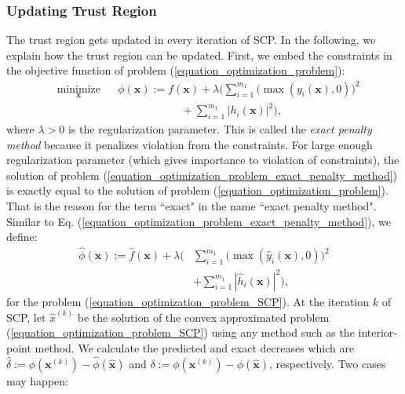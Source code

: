 \documentclass[lang=cn,10pt]{gorgeousnbook}
\numberwithin{equation}{section}%
\numberwithin{figure}{section}%
\begin{document}
\subsubsection{Updating Trust Region}


The trust region gets updated in every iteration of SCP. 
In the following, we explain how the trust region can be updated. 
First, we embed the constraints in the objective function of problem (\ref{equation_optimization_problem}):
\begin{equation}\label{equation_optimization_problem_exact_penalty_method}
\begin{aligned}
& \underset{\boldsymbol{x}}{\text{minimize}}
& & \phi(\boldsymbol{x}) := f(\boldsymbol{x}) + \lambda \Big(\sum_{i=1}^{m_1} \big(\max(y_i(\boldsymbol{x}), 0)\big)^2 \\
& & &~~~~~~~~~~~~~~~~~~~~~~~~~~ + \sum_{i=1}^{m_1} |h_i(\boldsymbol{x})|^2 \Big),
\end{aligned}
\end{equation}
where $\lambda > 0$ is the regularization parameter. 
This is called the \textit{exact penalty method} \cite{di1994exact} because it penalizes violation from the constraints. 
For large enough regularization parameter (which gives importance to violation of constraints), the solution of problem (\ref{equation_optimization_problem_exact_penalty_method}) is exactly equal to the solution of problem (\ref{equation_optimization_problem}). That is the reason for the term ``exact" in the name ``exact penalty method". 
Similar to Eq. (\ref{equation_optimization_problem_exact_penalty_method}), we define:
\begin{align}
\widehat{\phi}(\boldsymbol{x}) := \widehat{f}(\boldsymbol{x}) + \lambda \Big(&\sum_{i=1}^{m_1} \big(\max(\widehat{y}_i(\boldsymbol{x}), 0)\big)^2 \nonumber \\
&+ \sum_{i=1}^{m_1} |\widehat{h}_i(\boldsymbol{x})|^2 \Big),
\end{align}
for the problem (\ref{equation_optimization_problem_SCP}). 
At the iteration $k$ of SCP, let $\widehat{x}^{(k)}$ be the solution of the convex approximated problem (\ref{equation_optimization_problem_SCP}) using any method such as the interior-point method. 
We calculate the predicted and exact decreases which are $\widehat{\delta} := \phi(\boldsymbol{x}^{(k)}) - \widehat{\phi}(\widehat{\boldsymbol{x}})$ and $\delta := \phi(\boldsymbol{x}^{(k)}) - \phi(\widehat{\boldsymbol{x}})$, respectively. 
Two cases may happen:
\end{document}
